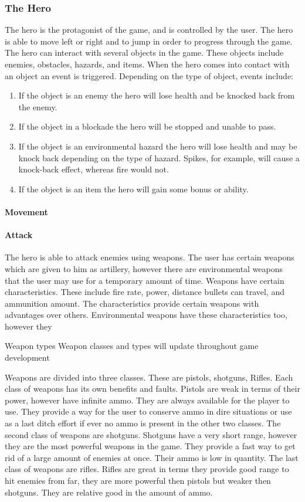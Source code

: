 \documentclass[12pt, titlepage]{article}
\begin{document}
\subsubsection{The Hero}
The hero is the protagonist of the game, and is controlled by the user.  The hero is able to move left or right and to jump in order to progress through the game.  The hero can interact with several objects in the game.  These objects include enemies, obstacles, hazards, and items.  When the hero comes into contact with an object an event is triggered.  Depending on the type of object, events include:

\begin{enumerate}
  \item If the object is an enemy the hero will lose health and be knocked back from the enemy.
  \item If the object in a blockade the hero will be stopped and unable to pass.
  \item If the object is an environmental hazard the hero will lose health and may be knock back depending on the type of hazard.  Spikes, for example, will cause a knock-back effect, whereas fire would not.
  \item If the object is an item the hero will gain some bonus or ability.
\end{enumerate}

\paragraph{Movement}

\paragraph{Attack}
The hero is able to attack enemies using weapons.  The user has certain weapons which are given to him as artillery, however there are environmental weapons that the user may use for a temporary amount of time.
Weapons have certain characteristics. These include fire rate, power, distance bullets can travel, and ammunition amount. The characteristics provide certain weapons with advantages over others. Environmental weapons have these characteristics too, however they

Weapon types
Weapon classes and types will update throughout game development

Weapons are divided into three classes. These are pistols, shotguns, Rifles.   Each class of weapons has its own benefits and faults. Pistols are weak in terms of their power, however have infinite ammo. They are always available for the player to use. They provide a way for the user to conserve ammo in dire situations or use as a last ditch effort if ever no ammo is present in the other two classes. The second class of weapons are shotguns. Shotguns have a very short range, however they are the most powerful weapons in the game. They provide a fast way to get rid of a large amount of enemies at once. Their ammo is low in quantity. The last class of weapons are rifles. Rifles are great in terms they provide good range to hit enemies from far, they are more powerful then pistols but weaker then shotguns. They are relative good in the amount of ammo.
\end{document}
